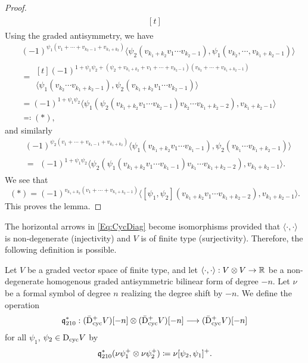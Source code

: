 \documentclass[\MainFolder/Text.tex]{subfiles}
\begin{document}
\begin{proof}
\begin{align*}
\begin{multlined}[t]
\end{multlined}
\end{align*}
Using the graded antisymmetry, we have
\begin{align*}
&(-1)^{\psi_1(v_1+\dotsb+v_{k_2-1} + v_{k_1 + k_2})}\langle \psi_2(v_{k_1+k_2} v_1\dotsb v_{k_2-1}),\psi_1(v_{k_2},\dotsb,v_{k_1+k_2-1})\rangle \\
&= \begin{multlined}[t](-1)^{1 + \psi_1 \psi_2 + (\psi_2 + v_{k_1 + k_2}+v_1+\dotsb+v_{k_2-1})(v_{k_2}+ \dotsb + v_{k_1+k_2-1})} \\ 
\langle \psi_1(v_{k_2}\dotsb v_{k_1+k_2-1}),\psi_2(v_{k_1+k_2} v_1 \dotsb v_{k_2-1})\rangle\end{multlined} \\
& = (-1)^{1+\psi_1 \psi_2}\langle\psi_1(\psi_2(v_{k_1 + k_2} v_1 \dotsb v_{k_2-1}) v_{k_2}\dotsb v_{k_1 + k_2 - 2}),v_{k_1 + k_2 - 1}\rangle \\
& \eqqcolon (*),
\end{align*}
and similarly
\begin{align*}
&(-1)^{\psi_2(v_1+\dotsb+v_{k_1-1} + v_{k_1+k_2})}\langle\psi_1(v_{k_1+k_2}v_1\dotsb v_{k_1-1}),\psi_2(v_{k_1}\dotsb v_{k_1+k_2-1})\rangle\\
&=\begin{multlined}
(-1)^{1+\psi_1 \psi_2} \langle \psi_2(\psi_1(v_{k_1+k_2} v_1 \dotsb v_{k_1-1}) v_{k_1} \dotsb v_{k_1+k_2-2}),v_{k_1 + k_2 - 1}\rangle.
\end{multlined}
\end{align*}
We see that 
$$ (*) = (-1)^{v_{k_1 + k_2}(v_1+\dotsb+v_{k_1+k_2-1})} \langle[\psi_1,\psi_2](v_{k_1+k_2} v_1 \dotsb v_{k_1 + k_2 - 2}), v_{k_1 + k_2 -1} \rangle. $$
This proves the lemma.
\end{proof} 

The horizontal arrows in \eqref{Eq:CycDiag} become isomorphisms provided that $\langle \cdot,\cdot \rangle$ is non-degenerate (injectivity) and $V$ is of finite type (surjectivity). Therefore, the following definition is possible.

\newcommand{\NDeg}{\mathbb{\nu}}
\begin{Definition}\label{Def:NewProduct}
Let $V$ be a graded vector space of finite type, and let $\langle \cdot,\cdot \rangle: V\otimes V \rightarrow \mathbb{R}$ be a non-degenerate homogenous graded antisymmetric bilinear form of degree $-n$. Let $\NDeg$ be a formal symbol of degree $n$ realizing the degree shift by $-n$. We define the operation 
$$ \mathfrak{q}^*_{210}: (\bar{\mathrm{D}}^+_{\mathrm{cyc}} V)[-n] \otimes (\bar{\mathrm{D}}^+_{\mathrm{cyc}} V)[-n] \longrightarrow (\bar{\mathrm{D}}^+_{\mathrm{cyc}} V)[-n] $$ 
for all $\psi_1$, $\psi_2 \in \mathrm{D}_{\mathrm{cyc}} V$ by
$$ \OPQ^*_{210}( \NDeg\psi_1^+\otimes \NDeg\psi_2^+) \coloneqq \NDeg[\psi_2,\psi_1]^+. $$
\end{Definition}
\end{document}
